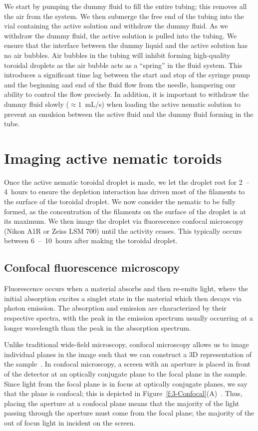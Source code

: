 We start by pumping the dummy fluid to fill the entire tubing; this removes all the air from the system.
We then submerge the free end of the tubing into the vial containing the active solution and withdraw the dummy fluid.
As we withdraw the dummy fluid, the active solution is pulled into the tubing.
We ensure that the interface between the dummy liquid and the active solution has no air bubbles.
Air bubbles in the tubing will inhibit forming high-quality toroidal droplets as the air bubble acts as a ``spring'' in the fluid system.
This introduces a significant time lag between the start and stop of the syringe pump and the beginning and end of the fluid flow from the needle, hampering our ability to control the flow precisely.
In addition, it is important to withdraw the dummy fluid slowly ($\approx 1$~mL/s) when loading the active nematic solution to prevent an emulsion between the active fluid and the dummy fluid forming in the tube.




\section{Imaging active nematic toroids}
Once the active nematic toroidal droplet is made, we let the droplet rest for 2~--4~hours to ensure the depletion interaction has driven most of the filaments to the surface of the toroidal droplet.
We now consider the nematic to be fully formed, as the concentration of the filaments on the surface of the droplet is at its maximum.
We then image the droplet via fluorescence confocal microscopy (Nikon A1R or Zeiss LSM 700) until the activity ceases.
This typically occurs between 6~--~10~hours after making the toroidal droplet.


\subsection{Confocal fluorescence microscopy}
Fluorescence occurs when a material absorbs and then re-emits light, where the initial absorption excites a singlet state in the material which then decays via photon emission.
The absorption and emission are characterized by their respective spectra, with the peak in the emission spectrum usually occurring at a longer wavelength than the peak in the absorption spectrum.

Unlike traditional wide-field microscopy, confocal microscopy allows us to image individual planes in the image such that we can construct a 3D representation of the sample~\cite{RN260}.
In confocal microscopy, a screen with an aperture is placed in front of the detector at an optically conjugate plane to the focal plane in the sample.
Since light from the focal plane is in focus at optically conjugate planes, we say that the plane is confocal; this is depicted in Figure~\ref{f:3-Confocal}(A)~\cite{RN259}.
Thus, placing the aperture at a confocal plane means that the majority of the light passing through the aperture must come from the focal plane; the majority of the out of focus light in incident on the screen.

